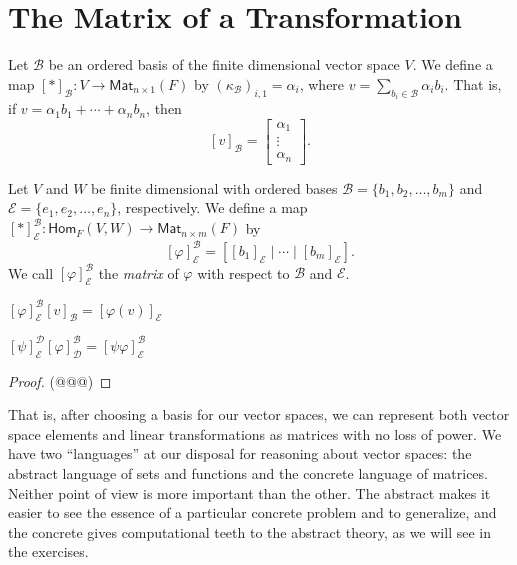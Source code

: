 \section{The Matrix of a Transformation}

\begin{dfn}
Let $\mathcal{B}$ be an ordered basis of the finite dimensional vector space $V$. We define a map $[\ast]_\mathcal{B} : V \rightarrow \mathsf{Mat}_{n \times 1}(F)$ by $(\kappa_\mathcal{B})_{i,1} = \alpha_i$, where $v = \sum_{b_i \in \mathcal{B}} \alpha_i b_i$. That is, if $v = \alpha_1 b_1 + \cdots + \alpha_n b_n$, then \[ [v]_\mathcal{B} = \left[ \begin{array}{c} \alpha_1 \\ \vdots \\ \alpha_n \end{array} \right]. \]
\end{dfn}

\begin{dfn}
Let $V$ and $W$ be finite dimensional with ordered bases $\mathcal{B} = \{b_1, b_2, \ldots, b_m\}$ and $\mathcal{E} = \{e_1, e_2, \ldots, e_n\}$, respectively. We define a map $[\ast]^\mathcal{B}_\mathcal{E} : \mathsf{Hom}_F(V,W) \rightarrow \mathsf{Mat}_{n \times m}(F)$ by $$[\varphi]^\mathcal{B}_\mathcal{E} = [[b_1]_\mathcal{E} \mid \cdots \mid [b_m]_\mathcal{E}].$$ We call $[\varphi]^\mathcal{B}_\mathcal{E}$ the \emph{matrix} of $\varphi$ with respect to $\mathcal{B}$ and $\mathcal{E}$.
\end{dfn}

\begin{prp}
\begin{enumerate*}
\item $[\varphi]^\mathcal{B}_\mathcal{E} [v]_\mathcal{B} = [\varphi(v)]_\mathcal{E}$
\item $[\psi]^\mathcal{D}_\mathcal{E} [\varphi]^\mathcal{B}_\mathcal{D} = [\psi\varphi]^\mathcal{B}_\mathcal{E}$
\end{enumerate*}
\end{prp}

\begin{proof}
(@@@)
\end{proof}

That is, after choosing a basis for our vector spaces, we can represent both vector space elements and linear transformations as matrices with no loss of power. We have two ``languages'' at our disposal for reasoning about vector spaces: the abstract language of sets and functions and the concrete language of matrices. Neither point of view is more important than the other. The abstract makes it easier to see the essence of a particular concrete problem and to generalize, and the concrete gives computational teeth to the abstract theory, as we will see in the exercises.




